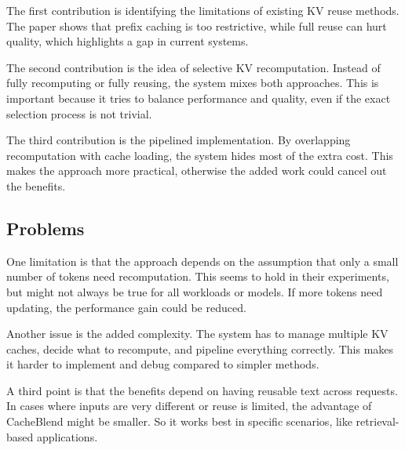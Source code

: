 \documentclass[a4paper, 12pt]{article}
\begin{document}
The first contribution is identifying the limitations of existing KV reuse methods. The paper shows that prefix caching is too restrictive, while full reuse can hurt quality, which highlights a gap in current systems.

The second contribution is the idea of selective KV recomputation. Instead of fully recomputing or fully reusing, the system mixes both approaches. This is important because it tries to balance performance and quality, even if the exact selection process is not trivial.

The third contribution is the pipelined implementation. By overlapping recomputation with cache loading, the system hides most of the extra cost. This makes the approach more practical, otherwise the added work could cancel out the benefits.

\subsection{Problems}

One limitation is that the approach depends on the assumption that only a small number of tokens need recomputation. This seems to hold in their experiments, but might not always be true for all workloads or models. If more tokens need updating, the performance gain could be reduced.

Another issue is the added complexity. The system has to manage multiple KV caches, decide what to recompute, and pipeline everything correctly. This makes it harder to implement and debug compared to simpler methods.

A third point is that the benefits depend on having reusable text across requests. In cases where inputs are very different or reuse is limited, the advantage of CacheBlend might be smaller. So it works best in specific scenarios, like retrieval-based applications.
\end{document}
